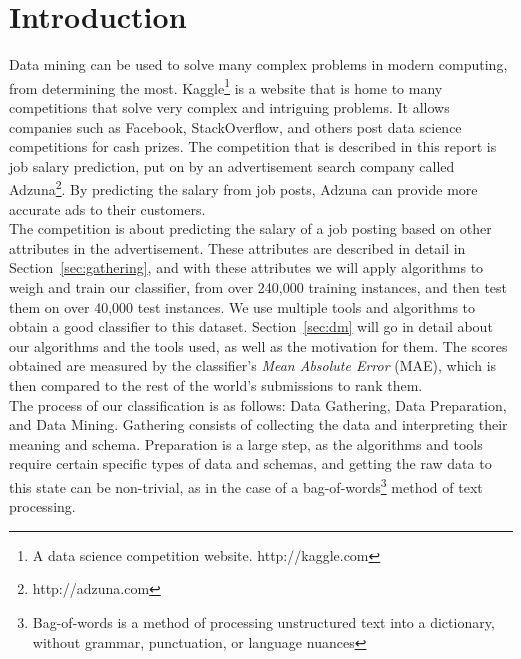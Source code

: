 \section{Introduction}
\label{sec:intro}
Data mining can be used to solve many complex problems in modern computing, from determining the most.  Kaggle\footnote{A data science competition website.  http://kaggle.com} is a website that is home to many competitions that solve very complex and intriguing problems.  It allows companies such as Facebook, StackOverflow, and others post data science competitions for cash prizes.  The competition that is described in this report is job salary prediction, put on by an advertisement search company called Adzuna\footnote{http://adzuna.com}.  By predicting the salary from job posts, Adzuna can provide more accurate ads to their customers.\\

The competition is about predicting the salary of a job posting based on other attributes in the advertisement.  These attributes are described in detail in Section~\ref{sec:gathering}, and with these attributes we will apply algorithms to weigh and train our classifier, from over 240,000 training instances, and then test them on over 40,000 test instances.   We use multiple tools and algorithms to obtain a good classifier to this dataset.  Section~\ref{sec:dm} will go in detail about our algorithms and the tools used, as well as the motivation for them.  The scores obtained are measured by the classifier's \textit{Mean Absolute Error} (MAE), which is then compared to the rest of the world's submissions to rank them.\\

The process of our classification is as follows: Data Gathering, Data Preparation, and Data Mining.  Gathering consists of collecting the data and interpreting their meaning and schema.  Preparation is a large step, as the algorithms and tools require certain specific types of data and schemas, and getting the raw data to this state can be non-trivial, as in the case of a bag-of-words\footnote{Bag-of-words is a method of processing unstructured text into a dictionary, without grammar, punctuation, or language nuances} method of text processing. 
